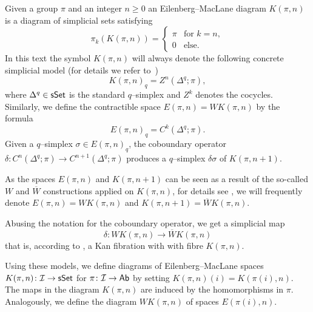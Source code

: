 \documentclass[12pt,a4wide]{article}
\theoremstyle{plain}
\theoremstyle{definition}
\newcommand{\Engen}{WK(\pi,\then)}
\newcommand{\Kngen}{\overline WK(\pi,\then)}
\newcommand{\Kpin}{K(\pi,\then)}
\newcommand{\then}{n}
\newcommand{\thedim}{{n}}
\newcommand{\thedimm}{{k}}
\newcommand{\stdsimp}[1]{\Delta^{#1}}
\renewcommand\:{\colon}
\def\s{\sigma}
\newcommand{\dpi}{\pi}
\newcommand{\dK}{K}
\newcommand{\icat}{\mathcal I}
\begin{document}
Given a group $\pi $ and an integer $\thedim \geq 0$ an Eilenberg--MacLane diagram $\Kpin$ is a diagram of simplicial sets satisfying
\[
\pi_\thedimm (\Kpin)= 
\left\{
	\begin{array}{ll}
		\pi & \mbox{for } \thedimm = \thedim,\\
		0 & \mbox{else}.
	\end{array}
\right.
\]
In this text the symbol $\Kpin$ will always denote the following concrete simplicial model (for details we refer to~\cite[page 101]{may})
\[
\Kpin_q = Z^\thedim (\stdsimp{q}; \pi),
\] 
where $\stdsimp{q} \in \sSet$ is the standard $q$--simplex and $Z^\thedimm$ denotes the cocycles. Similarly, we define the contractible space $E(\pi, \thedim) = \Engen$ by the formula
\[
E(\pi, \thedim)_q = C^\thedimm (\stdsimp{q}; \pi) .
\]
Given a $q$--simplex $\s \in E(\pi, \thedim)_q$, the coboundary operator $\delta\: C^\thedim (\stdsimp{q}; \pi) \to C^{\thedim+1} (\stdsimp{q}; \pi)$ produces a $q$--simplex $\delta \s$ of $K(\pi, \thedim+1)$. 

As the spaces $ E(\pi, \thedim)$ and $K(\pi, \thedim+1)$ can be seen as a result of the so-called $W$ and $\overline W$ constructions applied on $\Kpin$, for details see \cite{may}, we will frequently denote $E(\pi, \thedim) = \Engen$ and $K(\pi, \thedim+1) = \Kngen$.

Abusing the notation for the coboundary operator, we get a simplicial map 
\[ \delta \colon  \Engen \to \Kngen\] 
that is, according to \cite[Theorem 23.10]{may}, a Kan fibration with with fibre $\Kpin$.

Using these models, we define diagrams of Eilenberg--MacLane spaces $\Kpin\:\icat \to \sSet$ for $\dpi\: \icat \to \Ab$ by setting $\Kpin(i) = K(\dpi(i), \thedim)$. The maps in the diagram $\dK(\dpi, \thedim)$ are induced by the homomorphisms in $\dpi$.
Analogously, we define the diagram $\Engen$ of spaces $E(\dpi(i), \thedim)$.


\end{document}
